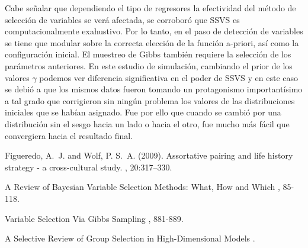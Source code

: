 \documentclass[DIV=calc, 
					paper=letter, 
					fontsize=11pt, 
					twocolumn]{scrartcl}
\begin{document}
Cabe se\~nalar que dependiendo el tipo de regresores la efectividad del m\'etodo de selecci\'on de variables se ver\'a afectada, se corrobor\'o que SSVS es computacionalmente exahustivo. Por lo tanto, en el paso de detecci\'on de variables se tiene que modular sobre la correcta elecci\'on de la funci\'on a-priori, as\'i como la configuraci\'on inicial. El muestreo de Gibbs también requiere la selecci\'on de los par\'ametros anteriores. En este estudio de simulaci\'on, cambiando el prior de los valores $\gamma$ podemos ver diferencia significativa en el poder de SSVS y en este caso se debi\'o a que los mismos datos fueron tomando un protagonismo important\'isimo a tal grado que corrigieron sin ning\'un problema los valores de las distribuciones iniciales que se hab\'ian asignado. Fue por ello que cuando se cambi\'o por una distribuci\'on sin el sesgo hacia un lado o hacia el otro, fue mucho m\'as f\'acil que convergiera hacia el resultado final.




\begin{thebibliography}{99} %

Figueredo, A.~J. and Wolf, P. S.~A. (2009).
\newblock Assortative pairing and life history strategy - a cross-cultural
  study.
, 20:317--330.
 
\newblock A Review of Bayesian Variable Selection
Methods: What, How and Which
, 85-118.
 
\newblock Variable Selection Via Gibbs Sampling
, 881-889.
 
\newblock A Selective Review of Group Selection in
High-Dimensional Models
.
 
\end{thebibliography}

\end{document}
